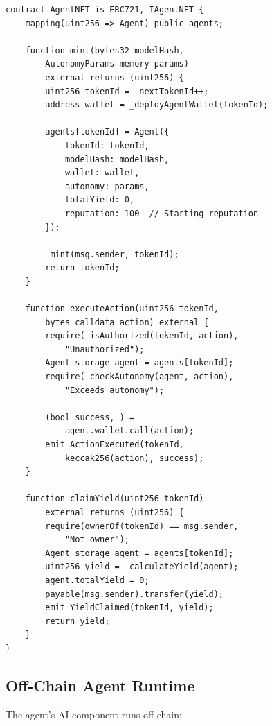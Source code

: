 \documentclass[11pt,letterpaper]{article}
\begin{document}
\begin{lstlisting}[language=Solidity,caption=AgentNFT Contract (Simplified)]
contract AgentNFT is ERC721, IAgentNFT {
    mapping(uint256 => Agent) public agents;

    function mint(bytes32 modelHash,
        AutonomyParams memory params)
        external returns (uint256) {
        uint256 tokenId = _nextTokenId++;
        address wallet = _deployAgentWallet(tokenId);

        agents[tokenId] = Agent({
            tokenId: tokenId,
            modelHash: modelHash,
            wallet: wallet,
            autonomy: params,
            totalYield: 0,
            reputation: 100  // Starting reputation
        });

        _mint(msg.sender, tokenId);
        return tokenId;
    }

    function executeAction(uint256 tokenId,
        bytes calldata action) external {
        require(_isAuthorized(tokenId, action),
            "Unauthorized");
        Agent storage agent = agents[tokenId];
        require(_checkAutonomy(agent, action),
            "Exceeds autonomy");

        (bool success, ) =
            agent.wallet.call(action);
        emit ActionExecuted(tokenId,
            keccak256(action), success);
    }

    function claimYield(uint256 tokenId)
        external returns (uint256) {
        require(ownerOf(tokenId) == msg.sender,
            "Not owner");
        Agent storage agent = agents[tokenId];
        uint256 yield = _calculateYield(agent);
        agent.totalYield = 0;
        payable(msg.sender).transfer(yield);
        emit YieldClaimed(tokenId, yield);
        return yield;
    }
}
\end{lstlisting}

\subsection{Off-Chain Agent Runtime}

The agent's AI component runs off-chain:
\end{document}
